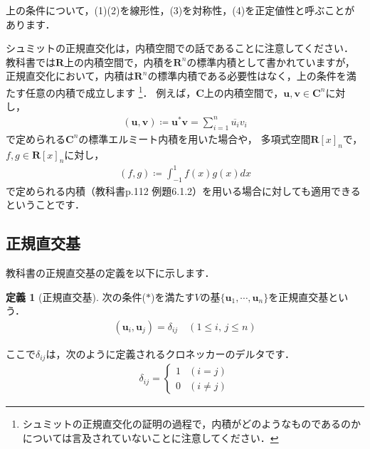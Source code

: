 \documentclass[dvipdfmx]{jsarticle}
\theoremstyle{definition}
\newtheorem*{definition*}{定義}
\begin{document}
上の条件について，(1)(2)を線形性，(3)を対称性，(4)を正定値性と呼ぶことがあります．

シュミットの正規直交化は，内積空間での話であることに注意してください．
教科書では$\bm{R}$上の内積空間で，内積を$\bm{R}^n$の標準内積として書かれていますが，
正規直交化において，内積は$\bm{R}^n$の標準内積である必要性はなく，上の条件を満たす任意の内積で成立します
\footnote{
    シュミットの正規直交化の証明の過程で，内積がどのようなものであるのかについては言及されていないことに注意してください．
}．
例えば，$\bm{C}$上の内積空間で，$\bm{u}, \bm{v} \in \bm{C}^n$に対し，
\begin{align}
    (\bm{u}, \bm{v}) \coloneqq \bm{u}^{*} \bm{v} = \sum_{i=1}^n \overline{u_i} v_i
    \label{norm_hermit}
\end{align}
で定められる$\bm{C}^n$の標準エルミート内積を用いた場合や，
多項式空間$\bm{R}[x]_n$で，$f, g \in \bm{R}[x]_n$に対し，
\begin{align}
    (f, g) \coloneqq \int_{-1}^{1} f(x) g(x) dx
    \label{func_ip}
\end{align}
で定められる内積（教科書p.112 例題6.1.2）を用いる場合に対しても適用できるということです．


\subsection{正規直交基}
教科書の正規直交基の定義を以下に示します．

\begin{leftbar}
    \begin{definition*}[正規直交基]
        次の条件($\ast$)を満たす$V$の基$\{ \bm{u}_1, \cdots, \bm{u}_n \}$を正規直交基という．
        \begin{align}
            (\bm{u}_i, \bm{u}_j) = \delta_{ij} \quad (1 \leq i, \, j \leq n) \tag{$\ast$}
        \end{align}
    \end{definition*}
\end{leftbar}

ここで$\delta_{ij}$は，次のように定義されるクロネッカーのデルタです．
\begin{align*}
    \delta_{ij} =
    \begin{cases}
        1 & (i = j) \\
        0 & (i \neq j)
    \end{cases}
\end{align*}
\end{document}
